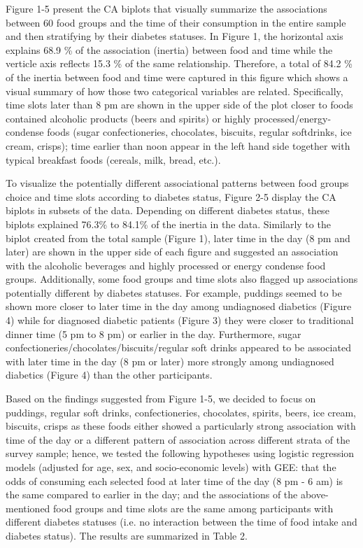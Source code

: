 \documentclass{bmcart}
\def\texttt{[image: ]}
\begin{document}
Figure 1-5 present the CA biplots that visually summarize the associations between 60 food groups and the time of their consumption in the entire sample and then stratifying by their diabetes statuses. In Figure 1, the horizontal axis explains 68.9 \% of the association (inertia) between food and time while the verticle axis reflects 15.3 \% of the same relationship. Therefore, a total of 84.2 \% of the inertia between food and time were captured in this figure which shows a visual summary of how those two categorical variables are related. Specifically, time slots later than 8 pm are shown in the upper side of the plot closer to foods contained alcoholic products (beers and spirits) or highly processed/energy-condense foods (sugar confectioneries, chocolates, biscuits, regular softdrinks, ice cream, crisps); time earlier than  noon appear in the left hand side together with typical breakfast foods (cereals, milk, bread, etc.).



To visualize the potentially different associational patterns between food groups choice and time slots according to diabetes status, Figure 2-5 display the CA biplots in subsets of the data. Depending on different diabetes status, these biplots explained 76.3\% to 84.1\% of the inertia in the data. Similarly to the biplot created from the total sample (Figure 1), later time in the day (8 pm and later) are shown in the upper side of each figure and suggested an association with the alcoholic beverages and highly processed or energy condense food groups. Additionally, some food groups and time slots also flagged up associations potentially different by diabetes statuses. For example, puddings seemed to be shown more closer to later time in the day among undiagnosed diabetics (Figure 4) while for diagnosed diabetic patients (Figure 3) they were closer to traditional dinner time (5 pm to 8 pm) or earlier in the day. Furthermore, sugar confectioneries/chocolates/biscuits/regular soft drinks appeared to be associated with later time in the day (8 pm or later) more strongly among undiagnosed diabetics (Figure 4) than the other participants.

Based on the findings suggested from Figure 1-5, we decided to focus on puddings, regular soft drinks, confectioneries, chocolates, spirits, beers, ice cream, biscuits, crisps as these foods either showed a particularly strong association with time of the day or a different pattern of association across different strata of the survey sample; hence, we tested the following hypotheses using logistic regression models (adjusted for age, sex, and socio-economic levels) with GEE: that the odds of consuming each selected food at later time of the day (8 pm - 6 am) is the same compared to earlier in the day; and the associations of the above-mentioned food groups and time slots are the same among participants with different diabetes statuses (i.e. no interaction between the time of food intake and diabetes status). The results are summarized in Table 2. 
\end{document}
